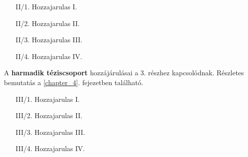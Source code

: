 \begin{enumerate}[wide = 0pt, widest = {III/5.}, leftmargin =*]
    \item[II/1.] Hozzajarulas I.
    
    \item[II/2.] Hozzajarulas II.

    \item[II/3.] Hozzajarulas III.
    
    \item[II/4.] Hozzajarulas IV.
\end{enumerate}

\noindent
A \textbf{harmadik téziscsoport} hozzájárulásai a 3. részhez kapcsolódnak. Részletes bemutatás a \ref{chapter_4}. fejezetben található.

\begin{enumerate}[wide = 0pt, widest = {III/5.}, leftmargin =*]
       \item[III/1.] Hozzajarulas I.
    
    \item[III/2.] Hozzajarulas II.

    \item[III/3.] Hozzajarulas III.
    
    \item[III/4.] Hozzajarulas IV.
\end{enumerate}